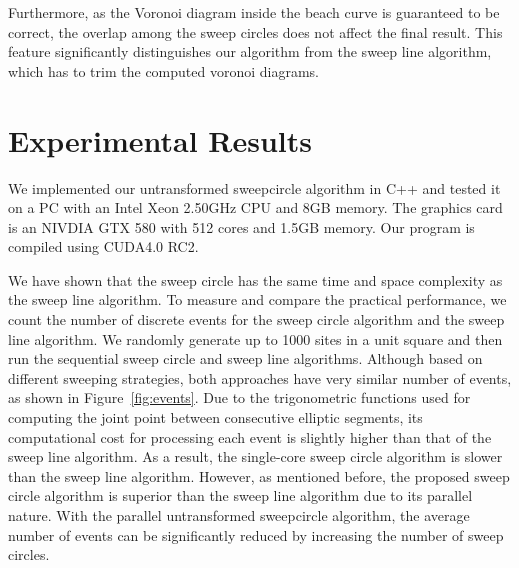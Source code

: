 {{Furthermore, as the Voronoi diagram inside the beach curve is
guaranteed to be correct, the overlap among the sweep circles does
not affect the final result. This feature significantly
distinguishes our algorithm from the sweep line algorithm, which has
to trim the computed voronoi diagrams.


\vspace{-0.1in}
\section{Experimental Results}\label{sec:sweepcircle-results}
\vspace{-0.1in} We implemented our untransformed sweepcircle
algorithm in C++ and tested it on a PC with an Intel Xeon 2.50GHz
CPU and 8GB memory. The graphics card is an NIVDIA GTX 580 with 512
cores and 1.5GB memory. Our program is compiled using CUDA4.0 RC2.

We have shown that the sweep circle has the same time and space
complexity as the sweep line algorithm. To measure and compare the
practical performance, we count the number of discrete events for
the sweep circle algorithm and the sweep line algorithm. We randomly
generate up to 1000 sites in a unit square and then run the
sequential sweep circle and sweep line algorithms. Although based on
different sweeping strategies, both approaches have very similar
number of events, as shown in Figure~\ref{fig:events}. Due to the
trigonometric functions used for computing the joint point between consecutive elliptic segments, its
computational cost for processing each event is slightly higher than
that of the sweep line algorithm. As a result, the single-core sweep
circle algorithm is slower than the sweep line algorithm. However,
as mentioned before, the proposed sweep circle algorithm is superior
than the sweep line algorithm due to its parallel nature. With the
parallel untransformed sweepcircle algorithm, the average number of events can be
significantly reduced by increasing the number of sweep circles.

}}
